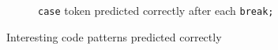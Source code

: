 \begin{figure}
\begin{subfigure}{\linewidth}
  \caption{{\tt case} token predicted correctly after each {\tt break;}}
  \label{fig:breakcase}
\end{subfigure}
  \caption{Interesting code patterns predicted correctly}
  \label{fig:ifpattern}
\end{figure}
